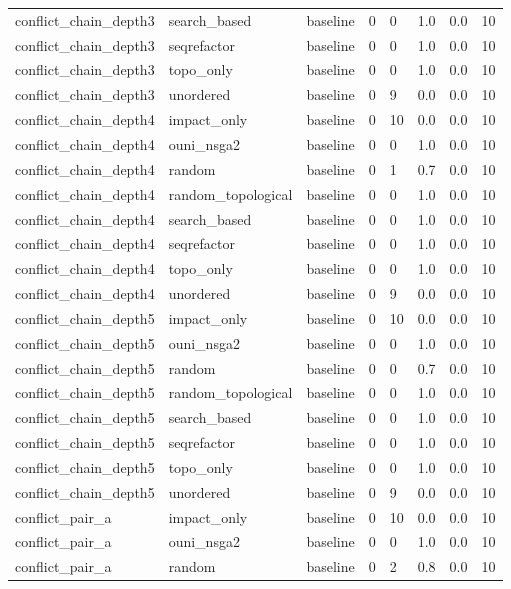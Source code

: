 \begin{table}[t]
\begin{tabular}{llllllll}
conflict\_chain\_depth3 & search\_based & baseline & 0 & 0 & 1.0 & 0.0 & 10 \\
conflict\_chain\_depth3 & seqrefactor & baseline & 0 & 0 & 1.0 & 0.0 & 10 \\
conflict\_chain\_depth3 & topo\_only & baseline & 0 & 0 & 1.0 & 0.0 & 10 \\
conflict\_chain\_depth3 & unordered & baseline & 0 & 9 & 0.0 & 0.0 & 10 \\
conflict\_chain\_depth4 & impact\_only & baseline & 0 & 10 & 0.0 & 0.0 & 10 \\
conflict\_chain\_depth4 & ouni\_nsga2 & baseline & 0 & 0 & 1.0 & 0.0 & 10 \\
conflict\_chain\_depth4 & random & baseline & 0 & 1 & 0.7 & 0.0 & 10 \\
conflict\_chain\_depth4 & random\_topological & baseline & 0 & 0 & 1.0 & 0.0 & 10 \\
conflict\_chain\_depth4 & search\_based & baseline & 0 & 0 & 1.0 & 0.0 & 10 \\
conflict\_chain\_depth4 & seqrefactor & baseline & 0 & 0 & 1.0 & 0.0 & 10 \\
conflict\_chain\_depth4 & topo\_only & baseline & 0 & 0 & 1.0 & 0.0 & 10 \\
conflict\_chain\_depth4 & unordered & baseline & 0 & 9 & 0.0 & 0.0 & 10 \\
conflict\_chain\_depth5 & impact\_only & baseline & 0 & 10 & 0.0 & 0.0 & 10 \\
conflict\_chain\_depth5 & ouni\_nsga2 & baseline & 0 & 0 & 1.0 & 0.0 & 10 \\
conflict\_chain\_depth5 & random & baseline & 0 & 0 & 0.7 & 0.0 & 10 \\
conflict\_chain\_depth5 & random\_topological & baseline & 0 & 0 & 1.0 & 0.0 & 10 \\
conflict\_chain\_depth5 & search\_based & baseline & 0 & 0 & 1.0 & 0.0 & 10 \\
conflict\_chain\_depth5 & seqrefactor & baseline & 0 & 0 & 1.0 & 0.0 & 10 \\
conflict\_chain\_depth5 & topo\_only & baseline & 0 & 0 & 1.0 & 0.0 & 10 \\
conflict\_chain\_depth5 & unordered & baseline & 0 & 9 & 0.0 & 0.0 & 10 \\
conflict\_pair\_a & impact\_only & baseline & 0 & 10 & 0.0 & 0.0 & 10 \\
conflict\_pair\_a & ouni\_nsga2 & baseline & 0 & 0 & 1.0 & 0.0 & 10 \\
conflict\_pair\_a & random & baseline & 0 & 2 & 0.8 & 0.0 & 10 \\

\end{tabular}
\end{table}
